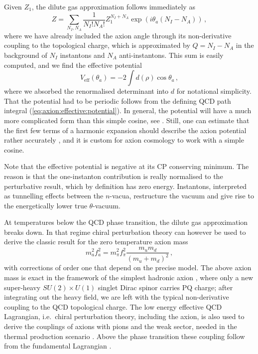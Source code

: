 \documentclass[preprint,nofootinbib]{revtex4}
\begin{document}
Given $Z_1$, the dilute gas approximation follows immediately as
\begin{equation}
 Z = \sum_{N_I,N_A}\frac{1}{N_I!N_A!} Z_1^{N_I+N_A} \exp(i\theta_a(N_I - N_A))\,,
\end{equation}
where we have already included the axion angle through its non-derivative coupling to the topological charge, which is approximated by $Q=N_I-N_A$ in the background of $N_I$ instantons and $N_A$ anti-instantons. This sum is easily computed, and we find the effective potential
\begin{equation}
 V_\mathrm{eff}(\theta_a)=-2\int d(\rho) \cos\theta_a\,,
\end{equation}
where we absorbed the renormalised determinant into $d$ for notational simplicity. That the potential had to be periodic follows from the defining QCD path integral (\ref{eq:axion:effective:potential}). In general, the potential will have a much more complicated form than this simple cosine, see \cite{halperin:zhitnitsky:yang:mills:theta,halperin:zhitnitsky:qcd:theta,halperin:zhitnitsky:qcd:axion:potential,fugleberg:halperin:zhitnitsky:domain:walls:theta:qcd,gabadadze:shifman:vacuum:structure:qcd,gabadadze:shifman:qcd:vacuum:axion}. Still, one can estimate that the first few terms of a harmonic expansion should describe the axion potential rather accurately \cite{kim:report}, and it is custom for axion cosmology to work with a simple cosine.

Note that the effective potential is negative at its CP conserving minimum. The reason is that the one-instanton contribution is really normalised to the perturbative result, which by definition has zero energy. Instantons, interpreted as tunnelling effects between the $n$-vacua, restructure the vacuum and give rise to the energetically lower true $\theta$-vacuum.

At temperatures below the QCD phase transition, the dilute gas approximation breaks down. In that regime chiral perturbation theory can however be used to derive the classic result for the zero temperature axion mass
\begin{equation}
 m^2_a f^2_a = m^2_\pi f^2_\pi \frac{m_u m_d}{(m_u+m_d)^2}\,, \label{eq:axion:mass:chiral_theory:T0}
\end{equation}
with corrections of order one that depend on the precise model. The above axion mass is exact in the framework of the simplest hadronic axion \cite{shifman:vainshtein:zakharov:cp,kim:axion}, where only a new super-heavy $SU(2) \times U(1)$ singlet Dirac spinor carries PQ charge; after integrating out the heavy field, we are left with the typical non-derivative coupling to the QCD topological charge. The low energy effective QCD Lagrangian, i.e.\ chiral perturbation theory, including the axion, is also used to derive the couplings of axions with pions and the weak sector, needed in the thermal production scenario \cite{hannestad:mirizzi:raffelt:thermal:axion}. Above the phase transition these coupling follow from the fundamental Lagrangian \cite{masso:rota:zsembinszki:axion:thermal}.
\end{document}
